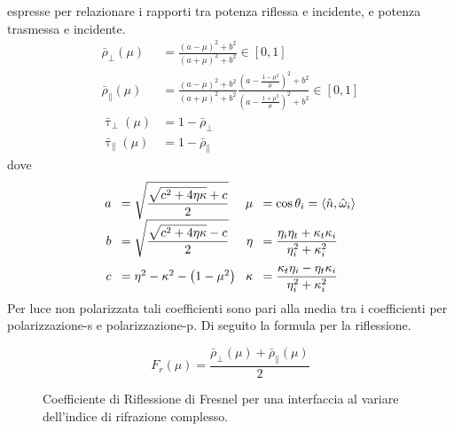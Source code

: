 espresse per relazionare i rapporti tra potenza riflessa e incidente, e potenza trasmessa e incidente\footnotemark{}.
\begin{align}
	\bar{\rho}_\perp(\mu) &= \frac{(a-\mu)^2+b^2}{(a+\mu)^2+b^2} \in [0,1] \\
	\bar{\rho}_\parallel(\mu) &= \frac{(a-\mu)^2+b^2}{(a+\mu)^2+b^2}\frac{(a-\frac{1-\mu^2}{\mu})^2+b^2}{(a-\frac{1+\mu^2}{\mu})^2+b^2} \in [0,1]\\
	\bar{\uptau}_\perp(\mu) &= 1-\bar{\rho}_\perp \\
	\bar{\uptau}_\parallel(\mu) &= 1-\bar{\rho}_\parallel
\end{align}
dove\footnotemark{}
\begin{align*}
	\arraycolsep=4pt\def\arraystretch{2.2}
	\begin{array}{rlrl}
		a &= \sqrt{\displaystyle\frac{\sqrt{c^2+4\eta\kappa}+c}{2}} & \mu &= \cos\theta_i = \langle \hat{n},\hat{\omega}_i\rangle \\
		b &= \sqrt{\displaystyle\frac{\sqrt{c^2+4\eta\kappa}-c}{2}} & \eta &={\displaystyle\frac{\eta_i\eta_t+\kappa_t\kappa_i}{\eta_i^2+\kappa_i^2}} \\
		c &= \eta^2-\kappa^2-\left( 1-\mu^2\right) & \kappa &= {\displaystyle\frac{\kappa_t\eta_i-\eta_t\kappa_i}{\eta_i^2+\kappa_i^2}}
	\end{array}
\end{align*}
Per luce non polarizzata tali coefficienti sono pari alla media tra i coefficienti per polarizzazione-s e polarizzazione-p. Di seguito la formula 
per la riflessione.\footnotemark{}\par
\begin{equation}
	F_r(\mu) = \frac{\bar{\rho}_\perp(\mu)+\bar{\rho}_\parallel(\mu)}{2}
\end{equation}
\begin{figure}
	\centering
	
	\caption{Coefficiente di Riflessione di Fresnel per una interfaccia al variare dell'indice di rifrazione complesso.}
	\label{chapter3:surface:fresnelMaterials}
\end{figure}
